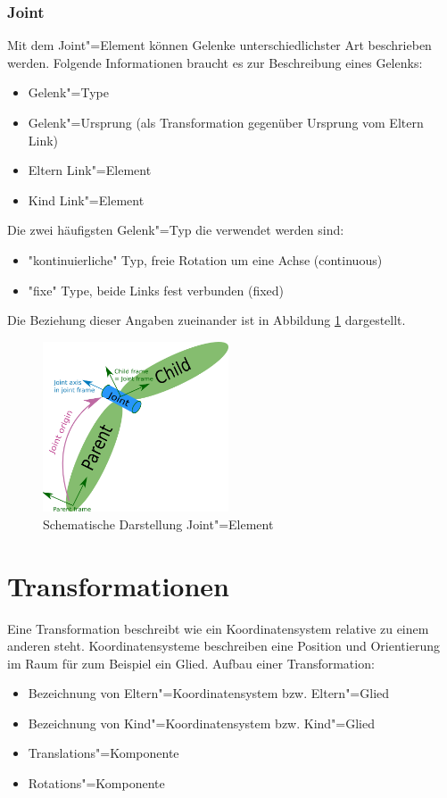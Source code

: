 \subsubsection{Joint}
\label{chap:joint}
Mit dem Joint"=Element können Gelenke unterschiedlichster Art beschrieben werden.
Folgende Informationen braucht es zur Beschreibung eines Gelenks:
\begin{itemize}
\item Gelenk"=Type
\item Gelenk"=Ursprung (als Transformation gegenüber Ursprung vom Eltern Link)
\item Eltern Link"=Element
\item Kind Link"=Element
\end{itemize}
Die zwei häufigsten Gelenk"=Typ die verwendet werden sind:
\begin{itemize}
\item \textsc{"}kontinuierliche\textsc{"} Typ, freie Rotation um eine Achse (continuous)
\item \textsc{"}fixe\textsc{"} Type, beide Links fest verbunden (fixed)
\end{itemize} 
Die Beziehung dieser Angaben  zueinander ist in Abbildung \ref{Ab:aufbaut-joint} dargestellt.
\begin{figure}[ht!]
	\centering
	\includegraphics[width=5.5cm]{images/urdf_joint.png}
	\caption{Schematische Darstellung Joint"=Element \cite{ros}}
	\label{Ab:aufbaut-joint}
\end{figure}




\section{Transformationen} %
\label{chap:transformationen}
Eine Transformation beschreibt wie ein Koordinatensystem relative zu einem anderen steht.
Koordinatensysteme beschreiben eine Position und Orientierung im Raum für zum Beispiel ein Glied.
Aufbau einer Transformation:
\begin{itemize}
\item Bezeichnung von Eltern"=Koordinatensystem bzw. Eltern"=Glied
\item Bezeichnung von Kind"=Koordinatensystem bzw. Kind"=Glied
\item Translations"=Komponente
\item Rotations"=Komponente
\end{itemize}

